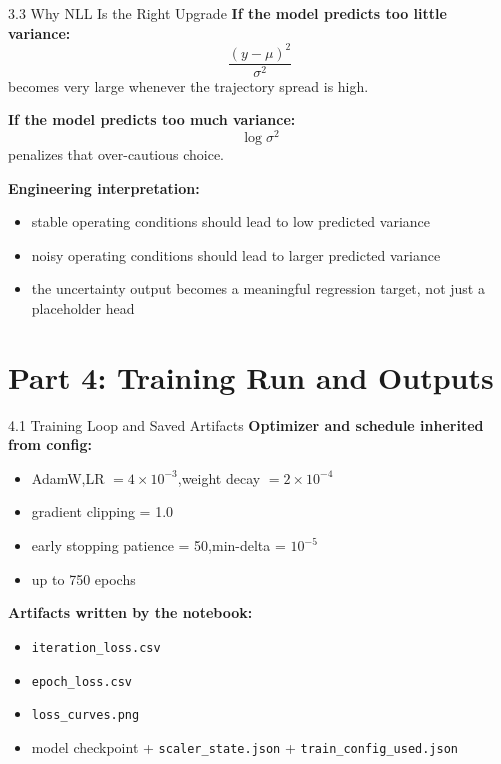 \documentclass[UTF8,aspectratio=169]{ctexbeamer}
\begin{document}
\begin{frame}{3.3 Why NLL Is the Right Upgrade}
\textbf{If the model predicts too little variance:}
\[
\frac{(y-\mu)^2}{\sigma^2}
\]
becomes very large whenever the trajectory spread is high.

\vspace{0.4em}
\textbf{If the model predicts too much variance:}
\[
\log \sigma^2
\]
penalizes that over-cautious choice.

\vspace{0.4em}
\textbf{Engineering interpretation:}
\begin{itemize}
  \item stable operating conditions should lead to low predicted variance
  \item noisy operating conditions should lead to larger predicted variance
  \item the uncertainty output becomes a meaningful regression target, not just a placeholder head
\end{itemize}
\end{frame}

\section{Part 4: Training Run and Outputs}

\begin{frame}{4.1 Training Loop and Saved Artifacts}
\textbf{Optimizer and schedule inherited from config:}
\begin{itemize}
  \item AdamW,\quad LR $=4\times 10^{-3}$,\quad weight decay $=2\times 10^{-4}$
  \item gradient clipping = 1.0
  \item early stopping patience = 50,\quad min-delta = $10^{-5}$
  \item up to 750 epochs
\end{itemize}

\vspace{0.3em}
\textbf{Artifacts written by the notebook:}
\begin{itemize}
  \item \texttt{iteration\_loss.csv}
  \item \texttt{epoch\_loss.csv}
  \item \texttt{loss\_curves.png}
  \item model checkpoint + \texttt{scaler\_state.json} + \texttt{train\_config\_used.json}
\end{itemize}
\end{frame}
\end{document}

